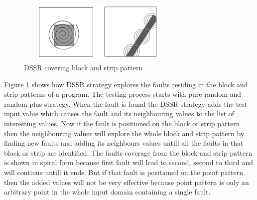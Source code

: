 \begin{figure}[htp]
\centering
\includegraphics[width=8cm,height=3cm]{figures/block2.png}
\caption{DSSR covering block and strip pattern}
\label{fig:block2}
\end{figure}

Figure \ref{fig:block2} shows how DSSR strategy explores the faults residing in the block and strip patterns of a program. The testing process starts with pure random and random plus strategy. When the fault is found the DSSR strategy adds the test input value which causes the fault and its neighbouring values to the list of interesting values. Now if the fault is positioned on the block or strip pattern then the neighbouring values will explore the whole block and strip pattern by finding new faults and adding its neighbours values untill all the faults in that block or strip are identified. The faults coverage from the block and strip pattern is shown in spiral form because first fault will lead to second, second to third and will continue untill it ends. But if that fault is positioned on the point pattern then the added values will not be very effective because point pattern is only an arbitrary point in the whole input domain containing a single fault.\\

